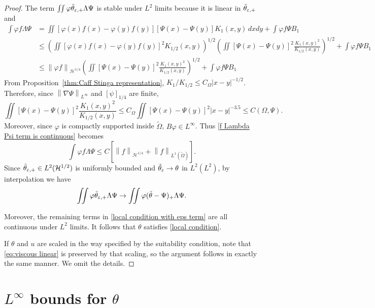 \documentclass[11pt]{amsart}
\theoremstyle{remark}
\theoremstyle{definition}
\newcommand{\norm}[1]{\left\lVert#1\right\rVert}
\newcommand{\paren}[1]{\left( #1 \right)}
\newcommand{\bracket}[1]{\left[ #1 \right]}
\newcommand{\grad}{\nabla}
\newcommand{\HD}{\mathcal{H}}
\begin{document}
\begin{proof}
The term $\iint \varphi \tilde{\theta}_{\varepsilon,+} \Lambda\Psi$ is stable under $L^2$ limits because it is linear in $\tilde{\theta}_{\varepsilon,+}$ and 
\begin{equation} \label{f Lambda Psi term is continuous} \begin{aligned}
\int \varphi f \Lambda\Psi &= \iint [\varphi(x) f(x) - \varphi(y) f(y)] [\Psi(x) - \Psi(y)] K_1(x,y) \,dxdy + \int \varphi f \Psi B_1
\\ &\leq \paren{\iint [\varphi(x) f(x) - \varphi(y) f(y)]^2 K_{1/2}(x,y)}^{1/2} \paren{\iint [\Psi(x) - \Psi(y)]^2 \frac{K_1(x,y)^2}{K_{1/2}(x,y)} }^{1/2} + \int \varphi f \Psi B_1
\\ &\leq \norm{\varphi f}_{\HD^{1/4}} \paren{\iint [\Psi(x) - \Psi(y)]^2 \frac{K_1(x,y)^2}{K_{1/2}(x,y)} }^{1/2} + \int \varphi f \Psi B_1
\end{aligned} \end{equation}
From Proposition~\ref{thm:Caff Stinga representation}, $K_1 / K_{1/2} \leq C_\Omega |x-y|^{-1/2}$.  Therefore, since $\norm{\grad\Psi}_{L^\infty}$ and $[\psi]_{1/4}$ are finite,
\[ \iint [\Psi(x) - \Psi(y)]^2 \frac{K_1(x,y)^2}{K_{1/2}(x,y)} \leq C_\Omega \iint [\Psi(x) - \Psi(y)]^2 |x-y|^{-3.5} \leq C(\Omega, \Psi). \]
Moreover, since $\varphi$ is compactly supported inside $\tilde{\Omega}$, $B\varphi \in L^\infty$.  Thus \eqref{f Lambda Psi term is continuous} becomes
\[ \int \varphi f \Lambda\Psi \leq C \bracket{\norm{f}_{\HD^{1/4}} + \norm{f}_{L^1(\tilde{\Omega})}}.  \]
Since $\thetaep \in L^2(\HD^{1/2})$ is uniformly bounded and $\tilde{\theta}_\varepsilon \to \theta$ in $L^2(L^2)$, by interpolation we have
\[ \iint \varphi \tilde{\theta}_{\varepsilon,+} \Lambda \Psi \to \iint \varphi (\tilde{\theta} - \Psi)_+ \Lambda \Psi. \]


Moreover, the remaining terms in \eqref{local condition with eps term} are all continuous under $L^2$ limits.  It follows that $\theta$ satisfies \eqref{local condition}.  

If $\theta$ and $u$ are scaled in the way specified by the suitability condition, note that \eqref{eq:viscous linear} is preserved by that scaling, so the argument follows in exactly the same manner.  We omit the details.  

\end{proof}


\vskip1cm
\section{$L^\infty$ bounds for $\theta$} \label{sec:Linfty}
\end{document}

